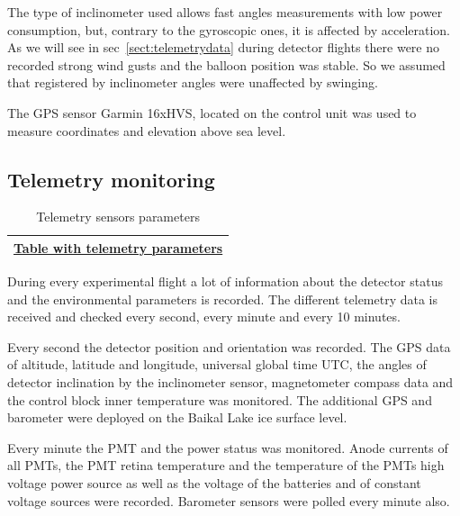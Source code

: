 \documentclass[final,5p,times,twocolumn]{elsarticle}
\begin{document}
The type of inclinometer used allows fast angles measurements with low power consumption, but, contrary to the gyroscopic ones, it is affected by acceleration. As we will see in sec~\ref{sect:telemetrydata} during detector flights there were no recorded strong wind gusts and the balloon position was stable. So we assumed that  registered by inclinometer angles were unaffected by swinging.

The GPS sensor Garmin 16xHVS, located on the control unit was used to measure coordinates and elevation above sea level.

\subsection{Telemetry monitoring\label{sect:telemetry}}



\begin{table}[bth]
\centering
\caption{Telemetry sensors parameters}
\label{tab:telemetry_sensors}
\vspace{1pc}
\begin{tabular}{||c||}
\hline
\href{https://docs.google.com/spreadsheets/d/1MEnVT2ue2mNZBabXCuhiacFWPkZbzGb2yeg4IZIXusI/edit?usp=sharing}{Table with telemetry parameters} \\
\hline
\end{tabular}
\end{table}

During every experimental flight a lot of information about the detector status and the environmental parameters is recorded. The different telemetry data is received and checked every second, every minute and every 10 minutes. 

Every second the detector position and orientation was recorded. The GPS data of altitude, latitude and longitude, universal global time UTC, the angles of detector inclination by the inclinometer sensor, magnetometer compass data and the control block inner temperature was monitored. The additional GPS and barometer were deployed on the Baikal Lake ice surface level.

Every minute the PMT and the power status was monitored. Anode currents of all PMTs, the PMT retina temperature and the temperature of the PMTs high voltage power source as well as the voltage of the batteries and of constant voltage sources were recorded. Barometer sensors were polled every minute also.
\end{document}
